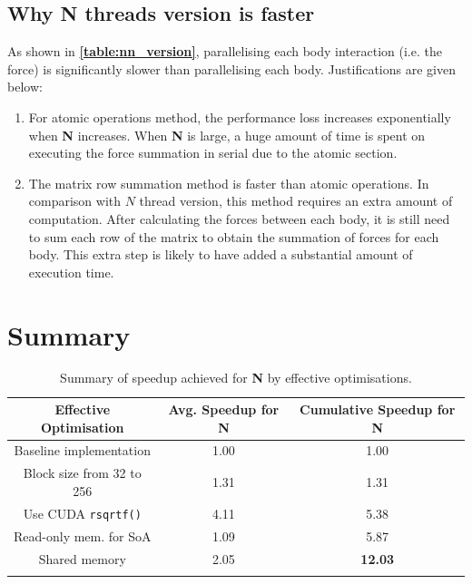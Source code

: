 \documentclass[12pt, a4paper]{article}
\let\oldcref\cref
\renewcommand{\cref}[1]{\textbf{\oldcref{#1}}}
\begin{document}
\subsection{Why N threads version is faster}
As shown in \cref{table:nn_version}, parallelising each body interaction (i.e. the force) is
significantly slower than parallelising each body. Justifications are given below:
\begin{enumerate}
  \item For atomic operations method, the performance loss increases exponentially when \textbf{N}
  increases. When \textbf{N} is large, a huge amount of time is spent on executing the force
  summation in serial due to the atomic section.

  \item The matrix row summation method is faster than atomic operations. In comparison with \(N\)
  thread version, this method requires an extra amount of computation. After calculating the forces
  between each body, it is still need to sum each row of the matrix to obtain the summation of
  forces for each body. This extra step is likely to have added a substantial amount of execution
  time.
\end{enumerate}

\pagebreak
\section{Summary}
\renewcommand{\arraystretch}{1.3}
\begin{longtable}{|c|c|c|}
  \hline \endfirsthead \rowcolor{lightgray}
  Effective Optimisation & Avg. Speedup for \textbf{N} & Cumulative Speedup for \textbf{N} \\ \hline
  Baseline implementation    & 1.00 & 1.00  \\
  Block size from 32 to 256  & 1.31 & 1.31  \\
  Use CUDA \texttt{rsqrtf()} & 4.11 & 5.38  \\
  Read-only mem. for SoA     & 1.09 & 5.87  \\
  Shared memory              & 2.05 & \textbf{12.03} \\ \hline
  \caption{Summary of speedup achieved for \textbf{N} by effective optimisations.}
\end{longtable}
\renewcommand{\arraystretch}{1}
\end{document}
